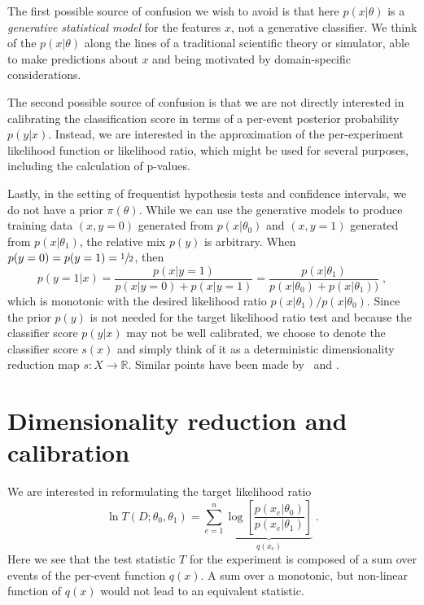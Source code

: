 \documentclass[aoas,preprint]{imsart}
\numberwithin{equation}{section}
\theoremstyle{plain}
\begin{document}
The first possible source of confusion we wish to avoid is that here $p(x|\theta)$  is a  \textit{generative statistical model} for the features $x$, not a generative classifier. We think of the  $p(x|\theta)$ along the lines of a traditional scientific theory or simulator, able to make predictions about $x$ and being motivated by domain-specific considerations. 

The second possible source of confusion is that 
we are not directly interested in calibrating the classification score in terms of a per-event posterior probability $p(y|x)$. 
Instead, we are interested in the approximation of the per-experiment likelihood function or likelihood ratio, which might be used for several purposes, including the calculation of p-values.

Lastly, in the setting of frequentist hypothesis tests and confidence intervals, we do not have a prior $\pi(\theta)$. 
While we can use the generative models to produce training data $(x,y=0)$ generated 
from $p(x|\theta_0)$ and $(x,y=1)$ generated from $p(x|\theta_1)$, the relative mix $p(y)$ 
is arbitrary.  When $p(y=0)=p(y=1)=\sfrac{1}{2}$, then 
\begin{equation}
p(y=1 | x) = \frac{p(x|y=1)}{p(x|y=0)+p(x|y=1)} = \frac{p(x|\theta_1)}{p(x|\theta_0)+p(x|\theta_1))} \;,
\end{equation}
which is monotonic with the desired likelihood ratio $p(x|\theta_1)/p(x|\theta_0)$.
Since the prior $p(y)$ is not needed for the target likelihood ratio test and because the classifier score $p(y|x)$ may not be well calibrated, we choose to denote the classifier score $s(x)$ and simply think of it as a deterministic dimensionality reduction map $s: X \to \mathbb{R}$.  Similar points have been made by~\cite{ClaytonScott} and \cite{Neal:2007zz}.



\section{Dimensionality reduction and calibration}


We are interested in reformulating the target likelihood ratio  
\begin{equation}
\ln T(D; \theta_0, \theta_1) =   \sum_{e=1}^n \underbrace{\log \left[ \frac {p(x_e | \theta_0) }{ p(x_e | \theta_1) } \right]}_{q(x_e)} \;.
\end{equation}
Here we see that the test statistic $T$ for the experiment is composed of a sum over events of the per-event function $q(x)$. A sum over a monotonic, but non-linear function of $q(x)$ would not lead to an equivalent statistic. 
\end{document}
